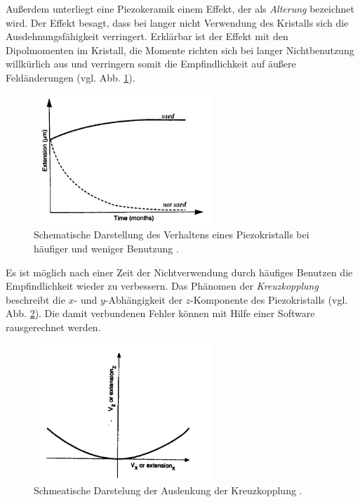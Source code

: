 Außerdem unterliegt eine Piezokeramik einem Effekt, der als \emph{Alterung} bezeichnet wird. Der Effekt besagt,
dass bei langer nicht Verwendung des Kristalls sich die Ausdehnungsfähigkeit verringert. Erklärbar ist der Effekt mit den %
Dipolmomenten im Kristall, die Momente richten sich bei langer Nichtbenutzung willkürlich aus und verringern %
somit die Empfindlichkeit auf äußere Feldänderungen (vgl. Abb. \ref{fig: ageing}).
\begin{figure}[!h]
  \centering
  \includegraphics[width=0.6\textwidth]{./pics/ageing.png}
  \caption{Schematische Darstellung des Verhaltens eines Piezokristalls bei häufiger und weniger Benutzung \cite{rtm}.} %
  \label{fig: ageing}
\end{figure}
Es ist möglich nach einer Zeit der Nichtverwendung
durch häufiges Benutzen die Empfindlichkeit wieder zu verbessern.
Das Phänomen der \emph{Kreuzkopplung} beschreibt die $x$- und $y$-Abhängigkeit der $z$-Komponente des Piezokristalls (vgl. Abb. \ref{fig: cross_copeling}). %
Die damit verbundenen Fehler können mit Hilfe einer Software rausgerechnet werden. %
\begin{figure}[!h]
  \centering
  \includegraphics[width=0.6\textwidth]{./pics/cross_copling.png}
  \caption{Schmeatische Darstelung der Auslenkung der Kreuzkopplung \cite{rtm}.}
  \label{fig: cross_copeling}
\end{figure}

